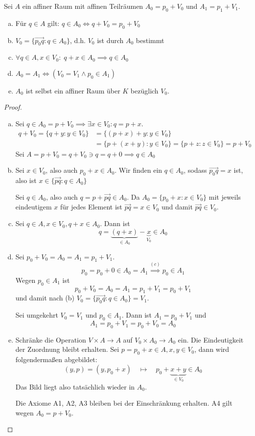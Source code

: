 \documentclass[a4paper, 10pt]{scrbook}
\begin{document}
\begin{lem} 
	\label{df: 8.6}
Sei $A$ ein affiner Raum mit affinen Teilräumen $A_0=p_0+V_0$ und $A_1=p_1+V_1$.
\begin{enumerate}[(a)]
\item Für $q\in A$ gilt: $q\in A_0 \iff q+V_0 = p_0+V_0$
\item $V_0=\{\vec{p_0q}:q\in A_0\}$, d.h. $V_0$ ist durch $A_0$ bestimmt
\item $\forall q\in A, x\in V_0 :\; q+x\in A_0 \implies q\in A_0$
\item $A_0=A_1 \iff (V_0=V_1 \land p_0\in A_1)$
\item $A_0$ ist selbst ein affiner Raum über $K$ bezüglich $V_0$.
\end{enumerate}
\begin{proof}
\begin{enumerate}[(a)]
\item
	Sei $q\in A_0 = p+V_0 \implies \exists x\in V_0: q=p+x$.
	\begin{align*}
		q+V_0=\{q+y:y\in V_0\}&=\{(p+x)+y:y\in V_0\}\\
	&=\{p+(x+y):y\in V_0\}=\{p+z:z\in V_0\}=p+V_0
	\end{align*}
	Sei $A=p+V_0=q+V_0\ni q=q+0 \implies q\in A_0$
\item
	Sei $x\in V_0$, also auch $p_0+x\in A_0$.
	Wir finden ein $q\in A_0$, sodass $\vec{p_0q}=x$ ist, also ist $x\in \{\vec{pq}:q\in A_0\}$

	Sei $q\in A_0$, also auch $q=p+\vec{pq}\in A_0$.
	Da $A_0 =\{p_0+x:x\in V_0\}$ mit jeweils eindeutigem $x$ für jedes Element ist $\vec{pq}=x\in V_0$ und damit $\vec{pq}\in V_0$.
\item
	Sei $q\in A, x\in V_0, q+x\in A_0$.
	Dann ist
	\[
		q = \underbrace{(q+x)}_{\in A_0}-\underbrace x_{V_0} \in A_0
	\]
\item
	Sei $p_0+V_0=A_0=A_1=p_1+V_1$.
	\[
		p_0=p_0+0\in A_0=A_1 \stackrel{(c)}\implies p_0\in A_1
	\]
	Wegen $p_0\in A_1$ ist
	\[
		p_0 + V_0 = A_0 = A_1 = p_1 + V_1 = p_0 + V_1
	\]
	und damit nach (b) $V_0 = \{\vec{p_0q}:q\in A_0\} = V_1$.

	Sei umgekehrt $V_0=V_1$ und $p_0\in A_1$.
	Dann ist $A_1 = p_0 + V_1$ und
	\[
		A_1=p_0+V_1=p_0+V_0=A_0
	\]
\item
	Schränke die Operation $V\times A \to A$ auf $V_0\times A_0\to A_0$ ein.
	Die Eindeutigkeit der Zuordnung bleibt erhalten.
	Sei $p = p_0 + x \in A, x,y\in V_0$, dann wird folgendermaßen abgebildet:
	\[
		(y,p) = (y,p_0+x) \quad \mapsto \quad p_0 + \underbrace{x + y}_{\in V_0} \in A_0
	\]
	Das Bild liegt also tatsächlich wieder in $A_0$.

	Die Axiome A1, A2, A3 bleiben bei der Einschränkung erhalten.
	A4 gilt wegen $A_0=p+V_0$.
\end{enumerate}
\end{proof}
\end{lem}
\end{document}
